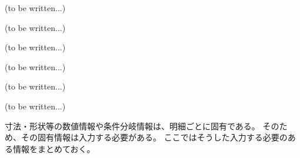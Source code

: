 \clearpage
(to be written...)


(to be written...)



(to be written...)


(to be written...)


(to be written...)


\modHeadsection{\dimple\TBW}
(to be written...)





寸法・形状等の数値情報や条件分岐情報は、明細ごとに固有である。
そのため、その固有情報は入力する必要がある。
ここではそうした入力する必要のある情報をまとめておく。




